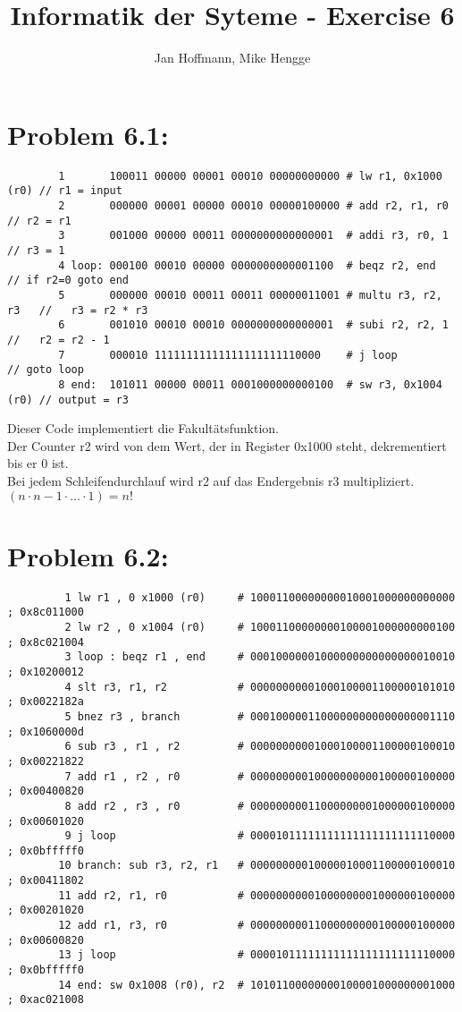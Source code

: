 \documentclass[10pt,a4paper]{article}
\title{Informatik der Syteme - Exercise 6}
\author{Jan Hoffmann, Mike Hengge}
\begin{document}
\section*{Problem 6.1:}
	\begin{verbatim}
		1       100011 00000 00001 00010 00000000000 # lw r1, 0x1000 (r0) // r1 = input				
		2       000000 00001 00000 00010 00000100000 # add r2, r1, r0     // r2 = r1					
		3       001000 00000 00011 0000000000000001  # addi r3, r0, 1     // r3 = 1						
		4 loop: 000100 00010 00000 0000000000001100  # beqz r2, end       // if r2=0 goto end	
		5       000000 00010 00011 00011 00000011001 # multu r3, r2, r3   //   r3 = r2 * r3		
		6       001010 00010 00010 0000000000000001  # subi r2, r2, 1     //   r2 = r2 - 1		
		7       000010 11111111111111111111110000    # j loop             // goto loop				
		8 end:  101011 00000 00011 0001000000000100  # sw r3, 0x1004 (r0) // output = r3			
	\end{verbatim}			
	Dieser Code implementiert die Fakultätsfunktion. \\
	Der Counter r2 wird von dem Wert, der in Register 0x1000 steht, dekrementiert bis er 0 ist. \\
	Bei jedem Schleifendurchlauf wird r2 auf das Endergebnis r3 multipliziert.\\
	$(n \cdot n-1 \cdot ... \cdot 1) = n!$

\section*{Problem 6.2:}
	\begin{verbatim}
		 1 lw r1 , 0 x1000 (r0)     # 10001100000000010001000000000000 ; 0x8c011000 
		 2 lw r2 , 0 x1004 (r0)     # 10001100000000100001000000000100 ; 0x8c021004 
		 3 loop : beqz r1 , end     # 00010000001000000000000000010010 ; 0x10200012 
		 4 slt r3, r1, r2           # 00000000001000100001100000101010 ; 0x0022182a 
		 5 bnez r3 , branch         # 00010000011000000000000000001110 ; 0x1060000d 
		 6 sub r3 , r1 , r2         # 00000000001000100001100000100010 ; 0x00221822 
		 7 add r1 , r2 , r0         # 00000000010000000000100000100000 ; 0x00400820 
		 8 add r2 , r3 , r0         # 00000000011000000001000000100000 ; 0x00601020 
		 9 j loop                   # 00001011111111111111111111110000 ; 0x0bfffff0 
		10 branch: sub r3, r2, r1   # 00000000010000010001100000100010 ; 0x00411802 
		11 add r2, r1, r0           # 00000000001000000001000000100000 ; 0x00201020 
		12 add r1, r3, r0           # 00000000011000000000100000100000 ; 0x00600820 
		13 j loop                   # 00001011111111111111111111110000 ; 0x0bfffff0 
		14 end: sw 0x1008 (r0), r2  # 10101100000000100001000000001000 ; 0xac021008 
	\end{verbatim}
\end{document}
